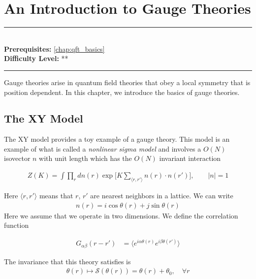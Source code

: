 \documentclass[book.tex]{subfiles}
\begin{document}
\chapter{An Introduction to Gauge Theories}

\label{chap:gauge_theories}
\noindent\rule{11cm}{0.4pt} \\
\textbf{Prerequisites:} \autoref{chap:qft_basics}  \\
\textbf{Difficulty Level:} ** \\
\noindent\rule{11cm}{0.4pt}
\vspace{5mm}

Gauge theories arise in quantum field theories that obey a local symmetry that is position dependent. In this chapter, we introduce the basics of gauge theories.

\section{The XY Model}

The XY model provides a toy example of a gauge theory. This model is an example of what is called a \textit{nonlinear sigma model} and involves a $O(N)$ isovector $n$ with unit length which has the $O(N)$ invariant interaction

\begin{align}
Z(K) = \int \prod_r dn(r) \exp \Bigg [ K \sum_{\langle r, r' \rangle} n(r) \cdot n(r') \Bigg ], \qquad |n| = 1
\end{align}

Here $\langle r, r' \rangle$ means that $r$, $r'$ are nearest neighbors in a lattice. We can write
\begin{align}
    n(r) = i \cos \theta(r) + j \sin \theta(r)
\end{align}
Here we assume that we operate in two dimensions. We define the correlation function

\begin{align}
G_{\alpha\beta}(r - r') &= \langle e^{i\alpha \theta(r)} e^{i\beta \theta(r')} \rangle
\end{align}

The invariance that this theory satisfies is
\begin{align}
\theta(r) \mapsto \mathcal{S}(\theta(r)) = \theta(r) + \theta_0, \quad \forall r
\end{align}

\end{document}
